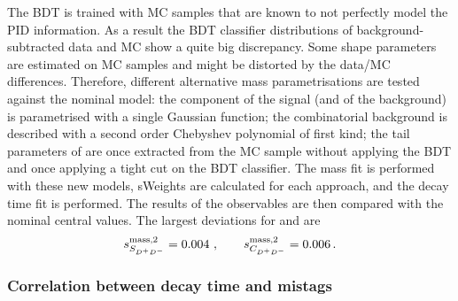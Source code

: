 The BDT is trained with MC samples that are known to not perfectly model the
PID information. As a result the BDT classifier distributions of
background-subtracted data and MC show a quite big discrepancy. Some shape
parameters are estimated on MC samples and might be distorted by the data/MC
differences. Therefore, different alternative mass parametrisations are tested
against the nominal model: the component of the \BdToDD signal (and of the
\BsToDD background) is parametrised with a single Gaussian function; the
combinatorial background is described with a second order Chebyshev polynomial
of first kind; the tail parameters of \BToDsD are once extracted from the MC
sample without applying the BDT and once applying a tight cut on the BDT
classifier. The mass fit is performed with these new models, sWeights are
calculated for each approach, and the decay time fit is performed. The results
of the \CP observables are then compared with the nominal central values. The
largest deviations for \SDD and \CDD are
\begin{align*}
s_{S_{{{D}^+}{{D}^-}}}^{\text{mass,2}} = \num{0.004}\ , \qquad s_{C_{{{D}^+}{{D}^-}}}^{\text{mass,2}} = \num{0.006}\,.
\end{align*}

\subsubsection{Correlation between decay time and mistags}
\label{sec:b02dd:systematics:correlation_mistag_time}

